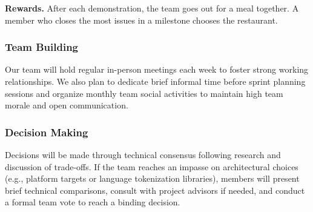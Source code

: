 \documentclass{article}
\begin{document}
\textbf{Rewards.} After each demonstration, the team goes out for a meal
together. A member who closes the most issues in a milestone chooses the
restaurant.

\subsubsection*{Team Building}
Our team will hold regular in-person meetings each week to foster strong working relationships. We also plan to dedicate brief informal time before sprint planning sessions and organize monthly team social activities to maintain high team morale and open communication.

\subsubsection*{Decision Making} 
Decisions will be made through technical consensus following research and discussion of trade-offs. If the team reaches an impasse on architectural choices (e.g., platform targets or language tokenization libraries), members will present brief technical comparisons, consult with project advisors if needed, and conduct a formal team vote to reach a binding decision.
\end{document}
